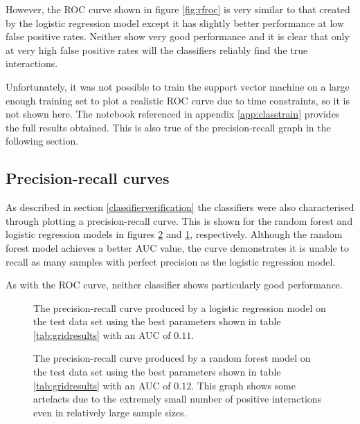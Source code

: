 However, the \ac{ROC} curve shown in figure \ref{fig:rfroc} is very similar to that created by the logistic regression model except it has slightly better performance at low false positive rates.
Neither show very good performance and it is clear that only at very high false positive rates will the classifiers reliably find the true interactions.


Unfortunately, it was not possible to train the support vector machine on a large enough training set to plot a realistic \ac{ROC} curve due to time constraints, so it is not shown here.
The notebook referenced in appendix \ref{app:classtrain} provides the full results obtained.
This is also true of the precision-recall graph in the following section.


\subsection{Precision-recall curves}

As described in section \ref{classifierverification} the classifiers were also characterised through plotting a precision-recall curve.
This is shown for the random forest and logistic regression models in figures \ref{fig:rfpr} and \ref{fig:logpr}, respectively.
Although the random forest model achieves a better \ac{AUC} value, the curve demonstrates it is unable to recall as many samples with perfect precision as the logistic regression model.

As with the \ac{ROC} curve, neither classifier shows particularly good performance.

\begin{figure}
    \centering
    \setlength\figureheight{2in}
    \setlength\figurewidth{3in}
    \caption{The precision-recall curve produced by a logistic regression model on the test data set using the best parameters shown in table \ref{tab:gridresults} with an \ac{AUC} of $0.11$.}
    \label{fig:logpr}
\end{figure}

\begin{figure}
    \centering
    \setlength\figureheight{2in}
    \setlength\figurewidth{3in}
    \caption{The precision-recall curve produced by a random forest model on the test data set using the best parameters shown in table \ref{tab:gridresults} with an \ac{AUC} of $0.12$. This graph shows some artefacts due to the extremely small number of positive interactions even in relatively large sample sizes.}
    \label{fig:rfpr}
\end{figure}

